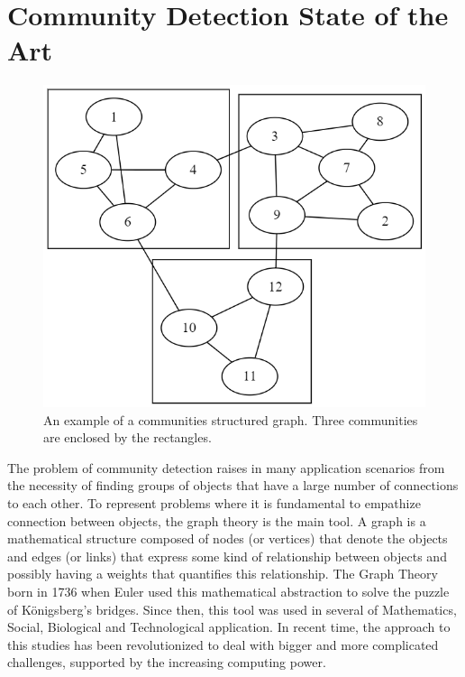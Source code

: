 \section{Community Detection State of the Art}\label{C3}
\begin{figure}[h]
	\centering
	\includegraphics[width=0.6\linewidth]{0-resources/community1}
	\caption{An example of a communities structured graph. Three communities are enclosed by the rectangles.}
	\label{fig:community1}
\end{figure}
\noindent The problem of community detection raises in many application scenarios from the necessity of finding groups of objects that have a large number of connections to each other. To represent problems where it is fundamental to empathize connection between objects, the graph theory is the main tool. A graph is a mathematical structure composed of nodes (or vertices) that denote the objects and edges (or links) that express some kind of relationship between objects and possibly having a weights that quantifies this relationship.
The Graph Theory born in 1736 when Euler used this mathematical abstraction to solve the puzzle of Königsberg’s bridges. Since then, this tool was used in several of Mathematics, Social, Biological and Technological application. In recent time, the approach to this studies has been revolutionized to deal with bigger and more complicated challenges, supported by the increasing computing power.
